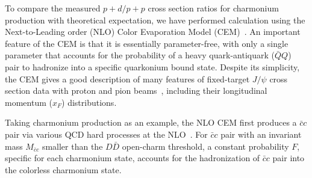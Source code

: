 \documentclass[reprint,aps,unsortedaddress,superscriptaddress,prl,floatfix,showpacs,linenumbers]{revtex4-2}
\begin{document}

To compare the measured $p+d / p+p$ cross section ratios for charmonium
production with theoretical expectation, we have performed calculation
using the Next-to-Leading order (NLO) Color Evaporation
Model (CEM)~\cite{fritzsch1977}.
An important feature of the CEM is that it is essentially parameter-free,
with only a single parameter that accounts for the probability of a
heavy quark-antiquark ($\bar Q Q$) pair to hadronize into a specific
quarkonium bound state. Despite its simplicity, the CEM
gives a good description of many features of fixed-target $J/\psi$
cross section data with proton and pion beams~\cite{schuler1996,chang2020},
including their longitudinal momentum ($x_F$) distributions.

Taking charmonium production as an example, the NLO CEM first
produces a $\bar c c$ pair via various QCD hard processes at
the NLO~\cite{mangano1993}.
For $\bar c c$ pair with an invariant mass $M_{\bar c c}$ smaller than
the $D \bar D$ open-charm threshold, a
constant probability $F$, specific for each charmonium state,
accounts for the hadronization of $\bar c c$ pair into the colorless
charmonium state.

\end{document}
